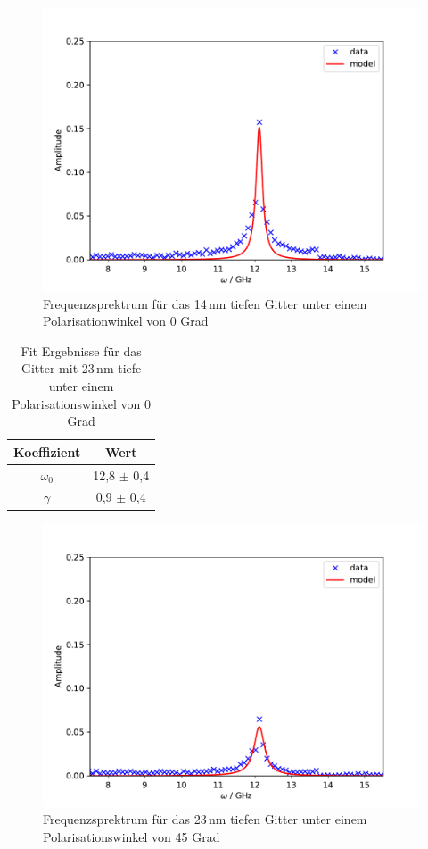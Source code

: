 \begin{figure}[h!]
 	\centering
 	\includegraphics[width=\textwidth]{img/005_a000_b0_e245_G4fft.pdf}
 	\caption{Frequenzsprektrum für das 14\,nm tiefen Gitter unter einem Polarisationwinkel von 0 Grad}
 	\label{abb:film}
\end{figure}

\begin{table}[h!]
 \centering
\begin{tabular}{cc}
    Koeffizient & Wert \\
	\midrule
 	$\omega_0$ & 12,8 $\pm$ 0,4 \\
 	$\gamma$ & 0,9 $\pm$ 0,4 \\
\end{tabular}
\caption{Fit Ergebnisse für das Gitter mit 23\,nm tiefe unter einem Polarisationswinkel von 0 Grad}
\label{tab:fit}
\end{table}

\begin{figure}[h!]
 	\centering
 	\includegraphics[width=\textwidth]{img/011_a000_b0_e245_G4_45fft.pdf}
 	\caption{Frequenzsprektrum für das 23\,nm tiefen Gitter unter einem Polarisationswinkel von 45 Grad}
 	\label{abb:film}
\end{figure}

